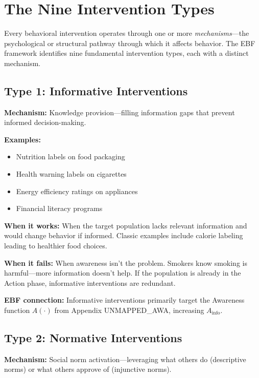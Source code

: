 \section{The Nine Intervention Types}
\label{sec:17-types}

Every behavioral intervention operates through one or more \textit{mechanisms}---the psychological or structural pathway through which it affects behavior. The EBF framework identifies nine fundamental intervention types, each with a distinct mechanism.

\subsection{Type 1: Informative Interventions}

\textbf{Mechanism:} Knowledge provision---filling information gaps that prevent informed decision-making.

\textbf{Examples:}
\begin{itemize}[nosep]
\item Nutrition labels on food packaging
\item Health warning labels on cigarettes
\item Energy efficiency ratings on appliances
\item Financial literacy programs
\end{itemize}

\textbf{When it works:} When the target population lacks relevant information and would change behavior if informed. Classic examples include calorie labeling leading to healthier food choices.

\textbf{When it fails:} When awareness isn't the problem. Smokers know smoking is harmful---more information doesn't help. If the population is already in the Action phase, informative interventions are redundant.

\textbf{EBF connection:} Informative interventions primarily target the Awareness function $A(\cdot)$ from Appendix UNMAPPED_AWA, increasing $A_{\text{info}}$.

\subsection{Type 2: Normative Interventions}

\textbf{Mechanism:} Social norm activation---leveraging what others do (descriptive norms) or what others approve of (injunctive norms).

